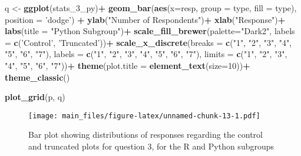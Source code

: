 \documentclass[
]{article}
\newenvironment{Shaded}{\begin{snugshade}}{\end{snugshade}}
\newcommand{\DataTypeTok}[1]{\textcolor[rgb]{0.13,0.29,0.53}{#1}}
\newcommand{\DecValTok}[1]{\textcolor[rgb]{0.00,0.00,0.81}{#1}}
\newcommand{\KeywordTok}[1]{\textcolor[rgb]{0.13,0.29,0.53}{\textbf{#1}}}
\newcommand{\NormalTok}[1]{#1}
\newcommand{\OperatorTok}[1]{\textcolor[rgb]{0.81,0.36,0.00}{\textbf{#1}}}
\newcommand{\StringTok}[1]{\textcolor[rgb]{0.31,0.60,0.02}{#1}}
\begin{document}
\begin{Shaded}
\begin{Highlighting}[]
\NormalTok{q <-}\StringTok{ }\KeywordTok{ggplot}\NormalTok{(stats_}\DecValTok{3}\NormalTok{_py)}\OperatorTok{+}
\StringTok{  }\KeywordTok{geom_bar}\NormalTok{(}\KeywordTok{aes}\NormalTok{(}\DataTypeTok{x=}\NormalTok{resp, }\DataTypeTok{group =}\NormalTok{ type, }\DataTypeTok{fill =}\NormalTok{ type), }\DataTypeTok{position =} \StringTok{'dodge'}\NormalTok{) }\OperatorTok{+}
\StringTok{  }\KeywordTok{ylab}\NormalTok{(}\StringTok{"Number of Respondents"}\NormalTok{)}\OperatorTok{+}
\StringTok{  }\KeywordTok{xlab}\NormalTok{(}\StringTok{"Response"}\NormalTok{)}\OperatorTok{+}
\StringTok{  }\KeywordTok{labs}\NormalTok{(}\DataTypeTok{title =} \StringTok{"Python Subgroup"}\NormalTok{)}\OperatorTok{+}
\StringTok{  }\KeywordTok{scale_fill_brewer}\NormalTok{(}\DataTypeTok{palette=}\StringTok{"Dark2"}\NormalTok{, }\DataTypeTok{labels =} \KeywordTok{c}\NormalTok{(}\StringTok{'Control'}\NormalTok{, }\StringTok{'Truncated'}\NormalTok{))}\OperatorTok{+}
\StringTok{  }\KeywordTok{scale_x_discrete}\NormalTok{(}\DataTypeTok{breaks =} \KeywordTok{c}\NormalTok{(}\StringTok{"1"}\NormalTok{, }\StringTok{"2"}\NormalTok{, }\StringTok{"3"}\NormalTok{, }\StringTok{"4"}\NormalTok{, }\StringTok{"5"}\NormalTok{, }\StringTok{"6"}\NormalTok{, }\StringTok{"7"}\NormalTok{), }\DataTypeTok{labels =} \KeywordTok{c}\NormalTok{(}\StringTok{"1"}\NormalTok{, }\StringTok{"2"}\NormalTok{, }\StringTok{"3"}\NormalTok{, }\StringTok{"4"}\NormalTok{, }\StringTok{"5"}\NormalTok{, }\StringTok{"6"}\NormalTok{, }\StringTok{"7"}\NormalTok{), }\DataTypeTok{limits =} \KeywordTok{c}\NormalTok{(}\StringTok{"1"}\NormalTok{, }\StringTok{"2"}\NormalTok{, }\StringTok{"3"}\NormalTok{, }\StringTok{"4"}\NormalTok{, }\StringTok{"5"}\NormalTok{, }\StringTok{"6"}\NormalTok{, }\StringTok{"7"}\NormalTok{))}\OperatorTok{+}
\StringTok{  }\KeywordTok{theme}\NormalTok{(}\DataTypeTok{plot.title =} \KeywordTok{element_text}\NormalTok{(}\DataTypeTok{size=}\DecValTok{10}\NormalTok{))}\OperatorTok{+}
\StringTok{  }\KeywordTok{theme_classic}\NormalTok{()}
\end{Highlighting}
\end{Shaded}

\begin{Shaded}
\begin{Highlighting}[]
\KeywordTok{plot_grid}\NormalTok{(p, q)}
\end{Highlighting}
\end{Shaded}

\begin{figure}
\centering
\texttt{[image: main\_files/figure-latex/unnamed-chunk-13-1.pdf]}
\caption{Bar plot showing distributions of responses regarding the
control and truncated plots for question 3, for the R and Python
subgroups}
\end{figure}
\end{document}
